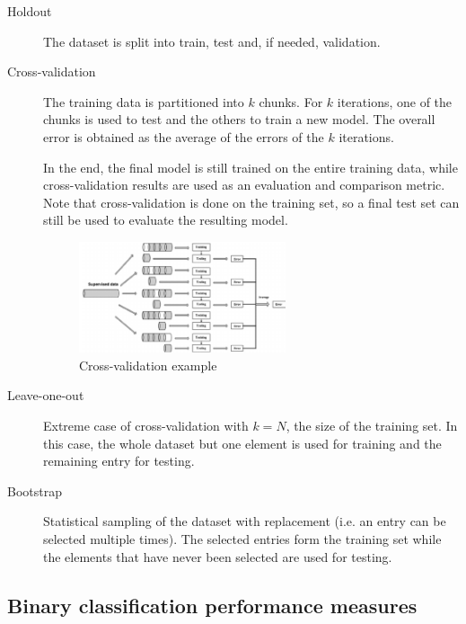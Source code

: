 \begin{description}
    \item[Holdout] 
        The dataset is split into train, test and, if needed, validation.

    \item[Cross-validation] 
        The training data is partitioned into $k$ chunks.
        For $k$ iterations, one of the chunks is used to test and the others to train a new model.
        The overall error is obtained as the average of the errors of the $k$ iterations.

        In the end, the final model is still trained on the entire training data, 
        while cross-validation results are used as an evaluation and comparison metric.
        Note that cross-validation is done on the training set, so a final test set can still be used to
        evaluate the resulting model.

        \begin{figure}[H]
            \centering
            \includegraphics[width=0.6\textwidth]{img/cross_validation.png}
            \caption{Cross-validation example}
        \end{figure}

    \item[Leave-one-out] 
        Extreme case of cross-validation with $k=N$, the size of the training set.
        In this case, the whole dataset but one element is used for training and the remaining entry for testing.

    \item[Bootstrap] 
        Statistical sampling of the dataset with replacement (i.e. an entry can be selected multiple times).
        The selected entries form the training set while the elements that have never been selected are used for testing.
\end{description}


\subsection{Binary classification performance measures}

